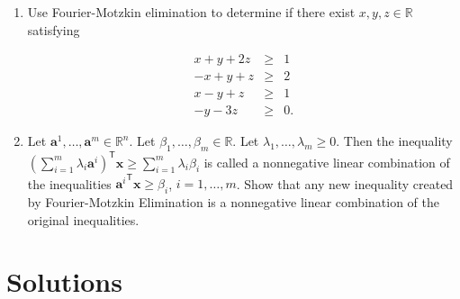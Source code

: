 \documentclass[]{book}
\providecommand{\tightlist}{%
  \setlength{\itemsep}{0pt}\setlength{\parskip}{0pt}}
\theoremstyle{definition}
\theoremstyle{definition}
\theoremstyle{remark}
\begin{document}
\begin{enumerate}
\def\labelenumi{\arabic{enumi}.}
\tightlist
\item
  Use Fourier-Motzkin elimination to determine if there exist
  \(x,y,z\in\mathbb{R}\) satisfying

  \begin{eqnarray*}
  x + y + 2z& \geq & 1 \\
  -x + y + z & \geq & 2 \\
  x-y + z  & \geq & 1 \\
  -y - 3z & \geq & 0.
  \end{eqnarray*}
\item
  Let \(\mathbf{a}^1,\ldots, \mathbf{a}^m \in \mathbb{R}^n\). Let
  \(\beta_1,\ldots, \beta_m \in\mathbb{R}\). Let
  \(\lambda_1,\ldots, \lambda_m \geq 0\). Then the inequality
  \(\displaystyle \left(\sum_{i = 1}^{m} \lambda_i {\mathbf{a}^{i}}\right)^\mathsf{T}\mathbf{x} \geq \sum_{i=1}^{m} \lambda_i \beta_i\)
  is called a nonnegative linear combination of the inequalities
  \({\mathbf{a}^{i}}^\mathsf{T} \mathbf{x} \geq \beta_i\),
  \(i = 1,\ldots, m\). Show that any new inequality created by
  Fourier-Motzkin Elimination is a nonnegative linear combination of the
  original inequalities.
\end{enumerate}

\section*{Solutions}\label{solutions-3}
\end{document}
